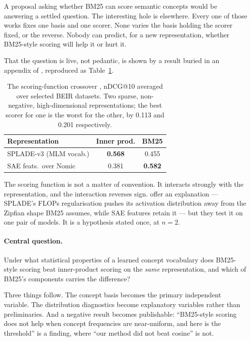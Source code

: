 \documentclass[11pt]{article}
\begin{document}
A proposal asking whether BM25 can score semantic concepts would be answering a settled question. The interesting hole is elsewhere. Every one of those works fixes one basis and one scorer. None varies the basis holding the scorer fixed, or the reverse. Nobody can predict, for a new representation, whether BM25-style scoring will help it or hurt it.

That the question is live, not pedantic, is shown by a result buried in an appendix of \citet{clavie2026latent}, reproduced as Table~\ref{tab:crossover}.

\begin{table}[t]
\centering\small
\begin{tabular}{lcc}
\toprule
Representation & Inner prod. & BM25 \\
\midrule
SPLADE-v3 (MLM vocab.) & \textbf{0.568} & 0.455 \\
SAE feats.\ over Nomic & 0.381 & \textbf{0.582} \\
\bottomrule
\end{tabular}
\caption{The scoring-function crossover \citep{clavie2026latent}, nDCG@10 averaged over selected BEIR datasets. Two sparse, non-negative, high-dimensional representations; the best scorer for one is the worst for the other, by 0.113 and 0.201 respectively.}
\label{tab:crossover}
\end{table}

The scoring function is not a matter of convention. It interacts strongly with the representation, and the interaction reverses sign. \citet{clavie2026latent} offer an explanation --- SPLADE's FLOPs regularisation pushes its activation distribution away from the Zipfian shape BM25 assumes, while SAE features retain it --- but they test it on one pair of models. It is a hypothesis stated once, at $n=2$.

\paragraph{Central question.} Under what statistical properties of a learned concept vocabulary does BM25-style scoring beat inner-product scoring on the \emph{same} representation, and which of BM25's components carries the difference?

Three things follow. The concept basis becomes the primary independent variable. The distribution diagnostics become explanatory variables rather than preliminaries. And a negative result becomes publishable: ``BM25-style scoring does not help when concept frequencies are near-uniform, and here is the threshold'' is a finding, where ``our method did not beat cosine'' is not.
\end{document}
